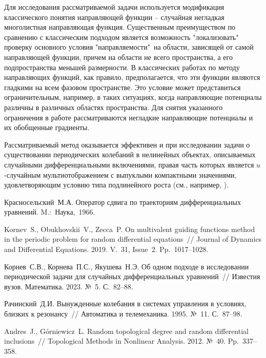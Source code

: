 Для исследования рассматриваемой задачи используется модификация классического понятия направляющей функции -- случайная негладкая многолистная направляющая функция. Существенным преимуществом по сравнению с классическим подходом является возможность "локализовать"$\,$ проверку основного условия "направляемости"$\,$ на области, зависящей от самой направляющей функции, причем на области не всего пространства, а его подпространства меньшей размерности. В классических работах по методу направляющих функций, как правило, предполагается, что эти функции являются гладкими на всем фазовом пространстве. Это условие может представиться ограничительным, например, в таких ситуациях, когда направляющие потенциалы различны в различных областях пространства. Для снятия указанного ограничения в работе рассматриваются негладкие направляющие потенциалы и их обобщенные градиенты.

Рассматриваемый метод оказывается эффективен и при исследовании задачи о существовании периодических колебаний в нелинейных объектах, описываемых случайными дифференциальными включениями, правая часть которых является $u$-случайным мультиотображением с выпуклыми компактными значениями, удовлетворяющим условию типа подлинейного роста (см., например, \cite{k_a}).


%

\begin{thebibliography}{9} %

 Красносельский~М.А. Оператор сдвига по траекториям дифференциальных уравнений. M.:~Наука,~1966.

 Kornev~S., Obukhovskii~V., Zecca~P. On multivalent guiding functions method in the periodic problem for random differential equations~// Journal of Dynamics and Differential Equations. 2019. V.~31, Issue~2. Pp.~1017--1028.

 Корнев~С.В., Корнева~П.С., Якушева~Н.Э. Об одном подходе в исследовании периодической задачи для случайных дифференциальных уравнений~// Известия вузов. Математика. 2023. №~5. С.~82--88.

 Рачинский~Д.И. Вынужденные колебания в системах управления в условиях, близких к резонансу~// Автоматика и телемеханика. 1995. №~11. С.~87--98.

 Andres~J., G\'orniewicz~L. Random topological degree and random differential inclusions~// Topological Methods in Nonlinear Analysis. 2012. №~40. Pp.~337--358.

\end{thebibliography}





%